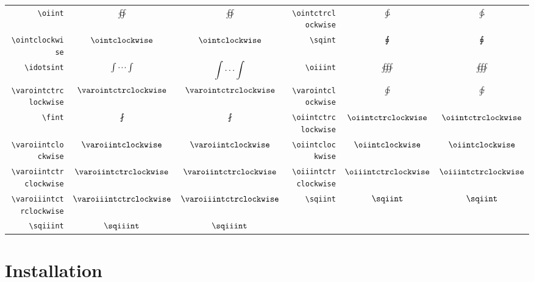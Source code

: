 \documentclass[a4paper,11pt]{christophe}
\begin{document}
\begin{center}
\begin{tabular}{r>{$}c<{$}c|r>{$}c<{$}c} 
\verb+\oiint+ &\oiint& $\displaystyle\oiint$ & 
\verb+\ointctrclockwise+ &\ointctrclockwise& $\displaystyle\ointctrclockwise$  \\
\verb+\ointclockwise+ &\ointclockwise& $\displaystyle\ointclockwise$ & 
\verb+\sqint+ &\sqint& $\displaystyle\sqint$ \\
\verb+\idotsint+ &\idotsint& $\displaystyle\idotsint$ & 
\verb+\oiiint+ &\oiiint& $\displaystyle\oiiint$ \\ 
\verb+\varointctrclockwise+ &\varointctrclockwise& $\displaystyle\varointctrclockwise$ & \verb+\varointclockwise+ &\varointclockwise& $\displaystyle\varointclockwise$ \\
\verb+\fint+ &\fint& $\displaystyle\fint$ & 
\verb+\oiintctrclockwise+ &\oiintctrclockwise& $\displaystyle\oiintctrclockwise$ \\ 
\verb+\varoiintclockwise+ &\varoiintclockwise& $\displaystyle\varoiintclockwise$ &
\verb+\oiintclockwise+ &\oiintclockwise& $\displaystyle\oiintclockwise$ \\ 
\verb+\varoiintctrclockwise+ &\varoiintctrclockwise& $\displaystyle\varoiintctrclockwise$ & \verb+\oiiintctrclockwise+ &\oiiintctrclockwise& $\displaystyle\oiiintctrclockwise$ \\
\verb+\varoiiintctrclockwise+ &\varoiiintctrclockwise& $\displaystyle\varoiiintctrclockwise$ & 
\verb+\sqiint+ &\sqiint& $\displaystyle\sqiint$ \\ 
\verb+\sqiiint+ &\sqiiint& $\displaystyle\sqiiint$ \\
\end{tabular}
\end{center}

\section{Installation}
\end{document}
